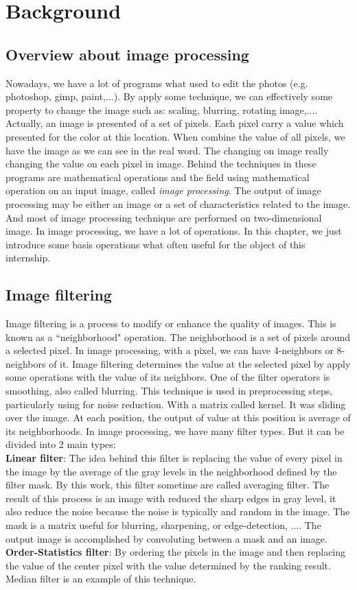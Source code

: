\chapter{Background}\section{Overview about image processing}
Nowadays, we have a lot of programs what used to edit the photos (e.g. photoshop, gimp, paint,...). By apply some technique, we can effectively some property to change the image such as: scaling, blurring, rotating image,.... Actually, an image is presented of a set of pixels. Each pixel carry a value which presented for the color at this location. When combine the value of all pixels, we have the image as we can see in the real word. The changing on image really changing the value on each pixel in image. Behind the techniques in these programs are mathematical operations and the field using mathematical operation on an input image,  called \textit{image processing}. The output of image processing may be either an image or a set of characteristics related to the image. And most of image processing technique are performed on two-dimensional image. In image processing, we have a lot of operations. In this chapter, we just introduce some basis operations what often useful for the object of this internship.
\section{Image filtering}
Image filtering is a process to modify or enhance the quality of images. This is known as a ``neighborhood" operation. The neighborhood is a set of pixels around a selected pixel. In image processing, with a pixel, we can have 4-neighbors or 8-neighbors of it. Image filtering determines the value at the selected pixel by apply some operations with the value of its neighbors. One of the filter operators is smoothing, also called blurring. This technique is used in preprocessing steps, particularly using for noise reduction. With a matrix called kernel. It was sliding over the image. At each position, the output of value at this position is average of its neighborhoods.
In image processing, we have many filter types. But it can be divided into 2 main types:\\[0.2cm]
\textbf{Linear filter}: The idea behind this filter is replacing the value of every pixel in the image by the average of the gray levels in the neighborhood defined by the filter mask. By this work, this filter sometime are called averaging filter. The result of this process is an image with reduced the sharp edges in gray level, it also reduce the noise because the noise is typically and random in the image. The mask is a matrix useful for blurring, sharpening, or edge-detection, .... The output image is accomplished by convoluting between a mask and an image.\\[0.2cm]
\textbf{Order-Statistics filter}: By ordering the pixels in the image and then replacing the value of the center pixel with the value determined by the ranking result. Median filter is an example of this technique.
